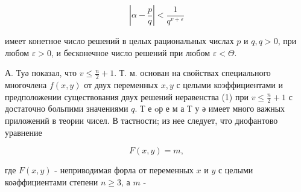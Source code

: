 \documentclass[10pt]{article}
\begin{document}
\[

\left|\alpha-\frac{p}{q}\right|<\frac{1}{q^{v+\varepsilon}}

\]



имеет конетное число решений в целых рациональных числах $p$ и $q, q>0$, при любом $\varepsilon>0$, и бесконечное число решений при любом $\varepsilon<\Theta$.



А. Туә показал, что $v \leqslant \frac{n}{2}+1$. Т. м. основан на свойствах специального многочлена $f(x, y)$ от двух переменных $x, y$ с целыми коэффициентами и предположении существования двух решений неравенства (1) при $v \leqslant \frac{n}{2}+1$ с достаточно больпими значениями $q$. Т е oр е м а Т у ә имеет много важных приложений в теории чисел. В тастности; из нее следует, что диофантово уравнение



\[

F(x, y)=m,

\]



где $F(x, y)$ - неприводимая форла от переменных $x$ и $y$ с целыми коәффициентами степени $n \geqslant 3$, а $m$ -
\end{document}
